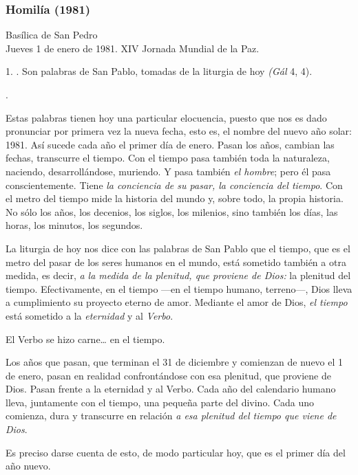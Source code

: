 \subsubsection{Homilía (1981)}

Basílica de San Pedro\\ Jueves 1 de enero de 1981. XIV Jornada Mundial de la Paz.


1. . Son palabras de San Pablo, tomadas de la liturgia de hoy \emph{(Gál} 4, 4).

\emph{}.

Estas palabras tienen hoy una particular elocuencia, puesto que nos es dado pronunciar por primera vez la nueva fecha, esto es, el nombre del nuevo año solar: 1981. Así sucede cada año el primer día de enero. Pasan los años, cambian las fechas, transcurre el tiempo. Con el tiempo pasa también toda la naturaleza, naciendo, desarrollándose, muriendo. Y pasa también \emph{el hombre}; pero él pasa conscientemente. Tiene \emph{la conciencia de su pasar, la conciencia del tiempo}. Con el metro del tiempo mide la historia del mundo y, sobre todo, la propia historia. No sólo los años, los decenios, los siglos, los milenios, sino también los días, las horas, los minutos, los segundos.

La liturgia de hoy nos dice con las palabras de San Pablo que el tiempo, que es el metro del pasar de los seres humanos en el mundo, está sometido también a otra medida, es decir, \emph{a la medida de la plenitud, que proviene de Dios:} la plenitud del tiempo. Efectivamente, en el tiempo ---en el tiempo humano, terreno---, Dios lleva a cumplimiento su proyecto eterno de amor. Mediante el amor de Dios, \emph{el tiempo} está sometido a la \emph{eternidad} y al \emph{Verbo}.

El Verbo se hizo carne\ldots{} en el tiempo.

Los años que pasan, que terminan el 31 de diciembre y comienzan de nuevo el 1 de enero, pasan en realidad confrontándose con esa plenitud, que proviene de Dios. Pasan frente a la eternidad y al Verbo. Cada año del calendario humano lleva, juntamente con el tiempo, una pequeña parte del  divino. Cada uno comienza, dura y transcurre en relación \emph{a esa plenitud del tiempo que viene de Dios}.

Es preciso darse cuenta de esto, de modo particular hoy, que es el primer día del año nuevo.

